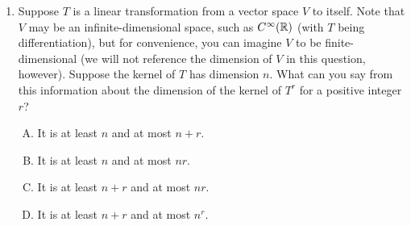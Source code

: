 \documentclass[10pt]{amsart}
\begin{document}
\begin{enumerate}
  {\em Answer}: Option (D)

  {\em Explanation}: We show the following:

  \begin{itemize}
  \item Any vector in the image of $T_1 + T_2$ can be expressed as the
    sum of a vector in the image of $T_1$ and a vector in the image of
    $T_2$: Suppose $\vec{v}$ is in the image of $T_1 + T_2$. Thus,
    $\vec{v} = (T_1 + T_2)(\vec{u})$ which simplifies to $T_1(\vec{u})
    + T_2(\vec{u})$, thus it is in the sum of the images.
  \item The image of $T_1 + T_2$ need not contain the intersection of
    the images of $T_1$ and $T_2$: We can again use the example of
    linear transformations with matrices $[1]$ and $[-1]$
    respectively.
  \item The image of $T_1 + T_2$ need not be contained in the
    intersection of the images of $T_1$ and $T_2$: We can again use
    the example of linear transformations with matrices $[1]$ and
    $[0]$. 
  \end{itemize}

  {\em Performance review}: 12 out of 27 got this. 8 chose (B), 4
  chose (C), 2 chose (E), 1 left the question blank.

  {\em Historical note (last time)}: $11$ out of $26$ got this. $11$ chose (B),
  $2$ chose (C), $1$ each chose (A) and (E).

\item Suppose $T$ is a linear transformation from a vector space $V$
  to itself. Note that $V$ may be an infinite-dimensional space, such
  as $C^\infty(\mathbb{R})$ (with $T$ being differentiation), but for
  convenience, you can imagine $V$ to be finite-dimensional (we will
  not reference the dimension of $V$ in this question,
  however). Suppose the kernel of $T$ has dimension $n$. What can you
  say from this information about the dimension of the kernel of $T^r$
  for a positive integer $r$?

  \begin{enumerate}[(A)]
  \item It is at least $n$ and at most $n + r$.
  \item It is at least $n$ and at most $nr$.
  \item It is at least $n + r$ and at most $nr$.
  \item It is at least $n + r$ and at most $n^r$.
  \end{enumerate}


\end{enumerate}
\end{document}
